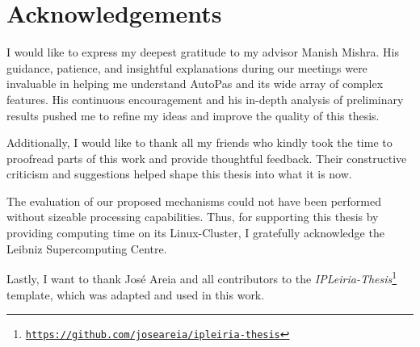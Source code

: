 \chapter*{Acknowledgements}

{
	\setlength\parindent{0pt}
	I would like to express my deepest gratitude to my advisor Manish Mishra. His guidance, patience, and insightful explanations during our meetings were invaluable in helping me understand AutoPas and its wide array of complex features. His continuous encouragement and his in-depth analysis of preliminary results pushed me to refine my ideas and improve the quality of this thesis.
	\vspace*{\baselineskip}
	
	Additionally, I would like to thank all my friends who kindly took the time to proofread parts of this work and provide thoughtful feedback. Their constructive criticism and suggestions helped shape this thesis into what it is now.
	\vspace*{\baselineskip}
	
	The evaluation of our proposed mechanisms could not have been performed without sizeable processing capabilities. Thus, for supporting this thesis by providing computing time on its Linux-Cluster, I gratefully acknowledge the Leibniz Supercomputing Centre.
	\vspace*{\baselineskip}
	
	Lastly, I want to thank José Areia and all contributors to the \textit{IPLeiria-Thesis}\footnote{\href{https://github.com/joseareia/ipleiria-thesis}{\texttt{https://github.com/joseareia/ipleiria-thesis}}} template, which was adapted and used in this work.
}


\MediaOptionLogicBlank